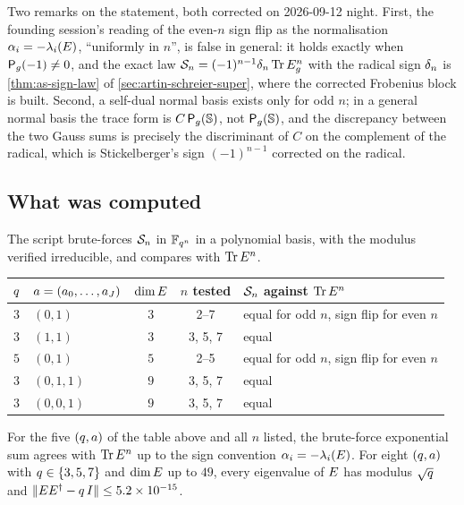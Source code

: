 Two remarks on the statement, both corrected on 2026-09-12 night. First, the founding
session's reading of the even-$n$ sign flip as the normalisation $\alpha_{i} =
-\lambda_i(E)$, ``uniformly in $n$'', is false in general: it holds exactly when
$\mathsf P_{g}(-1)\ne0$, and the exact law $\mathcal S_{n} = (-1)^{n-1}\delta_{n}\operatorname{Tr}E_g^n$ with
the radical sign $\delta_{n}$ is \cref{thm:as-sign-law} of \cref{sec:artin-schreier-super},
where the corrected Frobenius block is built. Second, a self-dual normal basis exists only
for odd $n$; in a general normal basis the trace form is $C\,\mathsf P_{g}(\mathbb S)$, not
$\mathsf P_{g}(\mathbb S)$, and the discrepancy between the two Gauss sums is precisely the
discriminant of $C$ on the complement of the radical, which is Stickelberger's sign
$(-1)^{n-1}$ corrected on the radical.

\subsection{What was computed}

The script brute-forces $\mathcal S_{n}$ in $\mathbb F_{q^{n}}$ in a polynomial basis, with
the modulus verified irreducible, and compares with $\operatorname{Tr}E^{n}$.

\begin{center}
\begin{tabular}{llccl}
\toprule
$q$ & $a = (a_0,\dots,a_{J})$ & $\dim E$ & $n$ tested
  & $\mathcal S_{n}$ against $\operatorname{Tr}E^{n}$ \\
\midrule
$3$ & $(0,1)$   & $3$ & 2--7    & equal for odd $n$, sign flip for even $n$ \\
$3$ & $(1,1)$   & $3$ & 3, 5, 7 & equal \\
$5$ & $(0,1)$   & $5$ & 2--5    & equal for odd $n$, sign flip for even $n$ \\
$3$ & $(0,1,1)$ & $9$ & 3, 5, 7 & equal \\
$3$ & $(0,0,1)$ & $9$ & 3, 5, 7 & equal \\
\bottomrule
\end{tabular}
\end{center}

\begin{numerical}
\label{num:artin-schreier-mps}
For the five $(q,a)$ of the table above and all $n$ listed, the brute-force
exponential sum agrees with $\operatorname{Tr}E^{n}$ up to the sign convention
$\alpha_{i} = -\lambda_i(E)$. For eight $(q,a)$ with $q\in\{3,5,7\}$
and $\dim E$ up to $49$, every eigenvalue of $E$ has modulus
$\sqrt{q}$ and $\|EE^{\dagger}-q\,I\| \le 5.2\times10^{-15}$.
\end{numerical}

